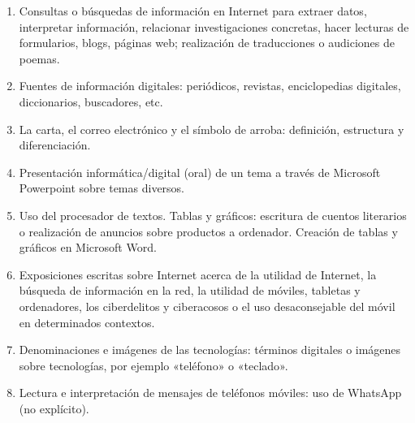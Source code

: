 \documentclass[spanish]{textolivre}
\begin{document}
\begin{enumerate}
    \item Consultas o búsquedas de información en Internet para extraer datos, interpretar información, relacionar investigaciones concretas, hacer lecturas de formularios, blogs, páginas web; realización de traducciones o audiciones de poemas.
    \item Fuentes de información digitales: periódicos, revistas, enciclopedias digitales, diccionarios, buscadores, etc.
    \item La carta, el correo electrónico y el símbolo de arroba: definición, estructura y diferenciación.
    \item Presentación informática/digital (oral) de un tema a través de Microsoft Powerpoint sobre temas diversos.
    \item Uso del procesador de textos. Tablas y gráficos: escritura de cuentos literarios o realización de anuncios sobre productos a ordenador. Creación de tablas y gráficos en Microsoft Word. 
    \item Exposiciones escritas sobre Internet acerca de la utilidad de Internet, la búsqueda de información en la red, la utilidad de móviles, tabletas y ordenadores, los ciberdelitos y ciberacosos o el uso desaconsejable del móvil en determinados contextos.
    \item Denominaciones e imágenes de las tecnologías: términos digitales o imágenes sobre tecnologías, por ejemplo «teléfono» o «teclado».
    \item Lectura e interpretación de mensajes de teléfonos móviles: uso de WhatsApp (no explícito).
\end{enumerate}
\end{document}
